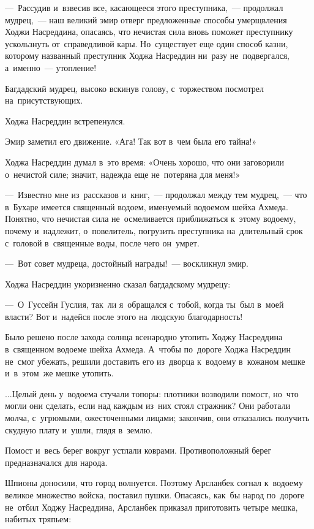 \documentclass[12pt,a4paper]{book}
\begin{document}
—~Рассудив и~взвесив все, касающееся этого преступника,~— продолжал мудрец,~— наш великий эмир отверг предложенные способы умерщвления Ходжи Насреддина, опасаясь, что нечистая сила вновь поможет преступнику ускользнуть от~справедливой кары. Но~существует еще один способ казни, которому названный преступник Ходжа Насреддин ни~разу не~подвергался, а~именно~— утопление!

Багдадский мудрец, высоко вскинув голову, с~торжеством посмотрел на~присутствующих.

Ходжа Насреддин встрепенулся.

Эмир заметил его движение. «Ага! Так вот в~чем была его тайна!»

Ходжа Насреддин думал в~это время: «Очень хорошо, что они заговорили о~нечистой силе; значит, надежда еще не~потеряна для меня!»

—~Известно мне из~рассказов и~книг,~— продолжал между тем мудрец,~— что в~Бухаре имеется священный водоем, именуемый водоемом шейха Ахмеда. Понятно, что нечистая сила не~осмеливается приближаться к~этому водоему, почему и~надлежит, о~повелитель, погрузить преступника на~длительный срок с~головой в~священные воды, после чего он~умрет.

—~Вот совет мудреца, достойный награды!~— воскликнул эмир.

Ходжа Насреддин укоризненно сказал багдадскому мудрецу:

—~О~Гуссейн Гуслия, так~ли я~обращался с~тобой, когда ты~был в~моей власти? Вот и~надейся после этого на~людскую благодарность!

Было решено после захода солнца всенародно утопить Ходжу Насреддина в~священном водоеме шейха Ахмеда. А~чтобы по~дороге Ходжа Насреддин не~смог убежать, решили доставить его из~дворца к~водоему в~кожаном мешке и~в~этом~же мешке утопить.

...Целый день у~водоема стучали топоры: плотники возводили помост, но~что могли они сделать, если над каждым из~них стоял стражник? Они работали молча, с~угрюмыми, ожесточенными лицами; закончив, они отказались получить скудную плату и~ушли, глядя в~землю.

Помост и~весь берег вокруг устлали коврами. Противоположный берег предназначался для народа.

Шпионы доносили, что город волнуется. Поэтому Арсланбек согнал к~водоему великое множество войска, поставил пушки. Опасаясь, как~бы народ по~дороге не~отбил Ходжу Насреддина, Арсланбек приказал приготовить четыре мешка, набитых тряпьем:
\end{document}
